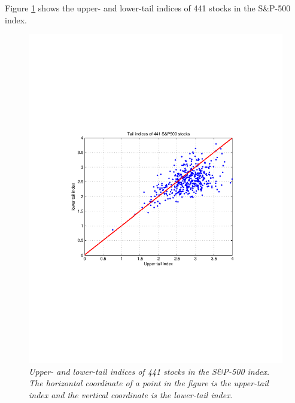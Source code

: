 \documentclass{article}
\begin{document}
\pagebreak
Figure \ref{fig:SP500-TailIndices} shows the upper- and lower-tail
indices of 441 stocks in the S\&P-500 index.
\begin{figure}[htb!]
  \centering
  \includegraphics[scale=0.5, clip=true, trim=94 229 115
  121]{../pics/SP500-TailIndices.pdf}
  \caption{\small \it Upper- and lower-tail indices of 441 stocks in
    the S\&P-500 index. The horizontal coordinate of a point in the
    figure is the upper-tail index and the vertical coordinate is the
    lower-tail index.}
  \label{fig:SP500-TailIndices}
\end{figure}
\end{document}
